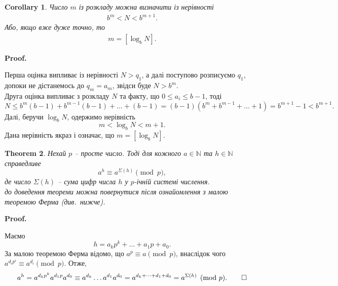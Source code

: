 \documentclass[a4paper, 10pt]{article}
\makeatletter
\theoremstyle{theoremdd}
\newtheorem{theorem}{Theorem}[subsection]
\theoremstyle{theoremdd}
\theoremstyle{theoremdd}
\theoremstyle{theoremdd}
\theoremstyle{theoremdd}
\theoremstyle{theoremdd}
\theoremstyle{theoremdd}
\theoremstyle{theoremdd}
\newtheorem{corollary}[theorem]{Corollary}
\renewenvironment{proof}[1][Proof.\\]{\par
\pushQED{\hfill \qed}%
\normalfont \topsep6\p@\@plus6\p@\relax
\trivlist
\item\relax
{\bfseries
#1\@addpunct{.}}\hspace\labelsep\ignorespaces
}{%
\popQED\endtrivlist\@endpefalse
}
\makeatother
\begin{document}
\begin{corollary}
Число $m$ із розкладу можна визначити із нерівності
\begin{align*}
b^m < N < b^{m+1}.
\end{align*}
Або, якщо вже дуже точно, то
\begin{align*}
m = [\log_b N].
\end{align*}
\end{corollary}

\begin{proof}
Перша оцінка випливає із нерівності $N > q_1$, а далі поступово розписуємо $q_1$, допоки не дістанемось до $q_m = a_m$, звідси буде $N > b^m$.\\
Друга оцінка випливає з розкладу $N$ та факту, що $0 \leq a_i \leq b-1$, тоді
\[
N \leq b^m (b-1) + b^{m-1} (b-1) + \dots + (b-1) = (b-1)(b^m + b^{m-1} + \dots + 1) = b^{m+1} - 1 < b^{m+1}.
\]
Далі, беручи $\log_b N$, одержимо нерівність
\[
m < \log_b N < m+1.
\]
Дана нерівність якраз і означає, що $m = [\log_b N]$. 
\end{proof}

\begin{theorem}
Нехай $p$ -- просте число. Тоді для кожного $a \in \mathbb{N}$ та $h \in \mathbb{N}$ справедливе
\begin{equation}
\label{eq:congruence_using_base_representation}
a^h \equiv a^{\Sigma (h)} \pmod p,
\end{equation}
де число $\Sigma (h)$ -- сума цифр числа $h$ у $p$-ічній системі числення.\\
\textit{до доведення теореми можна повернутися після ознайомлення з малою теоремою Ферма (див.\ нижче).}
\end{theorem}

\begin{proof}
Маємо 
\[
h = a_k p^k + \dots + a_1 p + a_0. 
\]
За малою теоремою Ферма відомо, що $a^p \equiv a \pmod p$, внаслідок чого $a^{d_i p^i} \equiv a^{d_i} \pmod p$. Отже,
\begin{gather*}
a^h = a^{d_k p^k} a^{d_1 p} a^{d_0} \equiv a^{d_k} \dots a^{d_1} a^{d_0} = a^{d_k + \dots + d_1 + d_0} = a^{\Sigma(h)} \pmod p. \qedhere
\end{gather*}
\end{proof}
\end{document}

